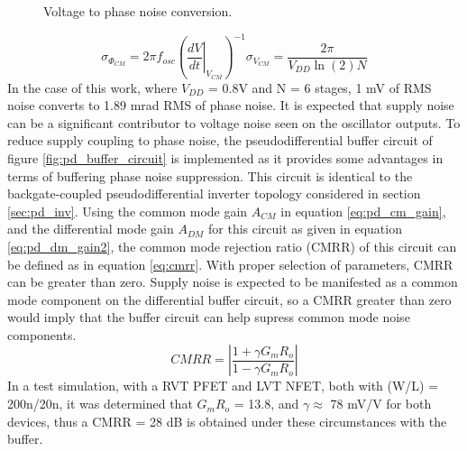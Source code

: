 			\begin{figure}[htb!]
			        \centering
			        
			    \caption{Voltage to phase noise conversion.}
			    \label{fig:voltn_to_pn}
			\end{figure}
			\begin{equation}\label{eq:vnoise_to_pnoise}
					\sigma_{\Phi_{CM}} = 2\pi f_{osc}\left(\left.\frac{dV}{dt}\right|_{V_{CM}}\right)^{-1}\sigma_{V_{CM}} = \frac{2\pi}{V_{DD}\ln(2)N} 
			\end{equation}
		In the case of this work, where $V_{DD}$ = 0.8V and N = 6 stages, 1 mV of RMS noise converts to 1.89 mrad RMS of phase noise. It is expected that supply noise can be a significant contributor to voltage noise seen on the oscillator outputs. To reduce supply coupling to phase noise, the pseudodifferential buffer circuit of figure \ref{fig:pd_buffer_circuit} is implemented as it provides some advantages in terms of buffering phase noise suppression. This circuit is identical to the backgate-coupled pseudodifferential inverter topology considered in section \ref{sec:pd_inv}. Using the common mode gain $A_{CM}$ in equation \ref{eq:pd_cm_gain}, and the differential mode gain $A_{DM}$ for this circuit as given in equation \ref{eq:pd_dm_gain2}, the common mode rejection ratio (CMRR) of this circuit can be defined as in equation \ref{eq:cmrr}. With proper selection of parameters, CMRR can be greater than zero. Supply noise is expected to be manifested as a common mode component on the differential buffer circuit, so a CMRR greater than zero would imply that the buffer circuit can help supress common mode noise components.
				\begin{equation}\label{eq:cmrr}
					CMRR = \left|\frac{1+\gamma G_m R_o}{1-\gamma G_m R_o}\right|
				\end{equation}
		In a test simulation, with a RVT PFET and LVT NFET, both with (W/L) = 200n/20n, it was determined that $G_m R_o$ = 13.8, and $\gamma\approx$ 78 mV/V for both devices, thus a CMRR = 28 dB is obtained under these circumstances with the buffer. 

		
